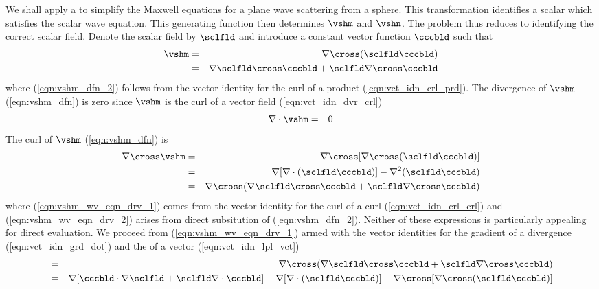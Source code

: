 \documentclass[12pt]{article}
\begin{document}
We shall apply a  to simplify
the Maxwell equations for a plane wave scattering from a sphere.
This transformation identifies a scalar 
which satisfies the scalar wave equation.
This generating function then determines $\vshm$ and $\vshn$.
The problem thus reduces to identifying the correct scalar field. 
Denote the scalar field by $\sclfld$ and introduce a constant vector
function $\cccbld$ such that
\begin{eqnarray}
\label{eqn:vshm_dfn}
\vshm & = & \nabla \cross (\sclfld \cccbld) \\
\label{eqn:vshm_dfn_2}
& = & \nabla \sclfld \cross \cccbld + \sclfld \nabla \cross \cccbld
\end{eqnarray}
where (\ref{eqn:vshm_dfn_2}) follows from the vector identity for the   
curl of a product (\ref{eqn:vct_idn_crl_prd}).
The divergence of $\vshm$ (\ref{eqn:vshm_dfn}) is zero since $\vshm$ 
is the curl of a vector field (\ref{eqn:vct_idn_dvr_crl})
\begin{eqnarray}
\nabla \cdot \vshm & = & 0
\label{eqn:vshm_dvr_dfn}
\end{eqnarray}
The curl of $\vshm$ (\ref{eqn:vshm_dfn}) is
\begin{eqnarray}
\nabla \cross \vshm 
& = & \nabla \cross [ \nabla \cross (\sclfld \cccbld) ] \nonumber \\
\label{eqn:vshm_wv_eqn_drv_1}
& = & \nabla [ \nabla \cdot (\sclfld \cccbld) ]
- \nabla^{2} ( \sclfld \cccbld ) \\
\label{eqn:vshm_wv_eqn_drv_2}
& = & \nabla \cross ( 
\nabla \sclfld \cross \cccbld + \sclfld \nabla \cross \cccbld 
)
\end{eqnarray}
where (\ref{eqn:vshm_wv_eqn_drv_1}) comes from the vector identity for
the curl of a curl (\ref{eqn:vct_idn_crl_crl}) and
(\ref{eqn:vshm_wv_eqn_drv_2}) arises from direct subsitution of
(\ref{eqn:vshm_dfn_2}). 
Neither of these expressions is particularly appealing for direct
evaluation. 
We proceed from (\ref{eqn:vshm_wv_eqn_drv_1}) armed with the vector 
identities for the gradient of a divergence
(\ref{eqn:vct_idn_grd_dot}) and the  of a vector  
(\ref{eqn:vct_idn_lpl_vct})
\begin{eqnarray}
& = & \nabla \cross ( 
\nabla \sclfld \cross \cccbld + \sclfld \nabla \cross \cccbld 
) \nonumber \\
& = & \nabla [ \cccbld \cdot \nabla \sclfld + \sclfld \nabla \cdot \cccbld ] 
- \nabla [\nabla \cdot (\sclfld\cccbld)] - 
\nabla \cross [\nabla \cross (\sclfld\cccbld)] \nonumber
\label{eqn:vshm_wv_eqn_drv_1}
\end{eqnarray}
\end{document}
